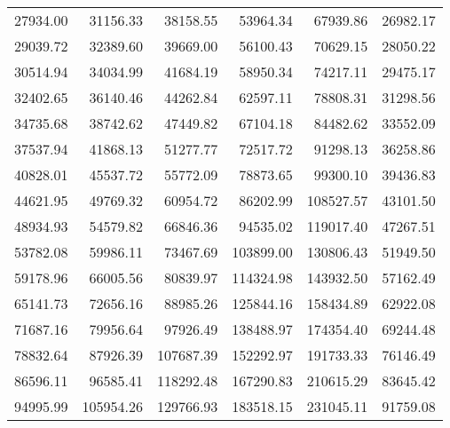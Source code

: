 \begin{tabular}{rrrrrr}
           27934.00 &            31156.33 &            38158.55 &            53964.34 &            67939.86 &            26982.17 \\
           29039.72 &            32389.60 &            39669.00 &            56100.43 &            70629.15 &            28050.22 \\
           30514.94 &            34034.99 &            41684.19 &            58950.34 &            74217.11 &            29475.17 \\
           32402.65 &            36140.46 &            44262.84 &            62597.11 &            78808.31 &            31298.56 \\
           34735.68 &            38742.62 &            47449.82 &            67104.18 &            84482.62 &            33552.09 \\
           37537.94 &            41868.13 &            51277.77 &            72517.72 &            91298.13 &            36258.86 \\
           40828.01 &            45537.72 &            55772.09 &            78873.65 &            99300.10 &            39436.83 \\
           44621.95 &            49769.32 &            60954.72 &            86202.99 &           108527.57 &            43101.50 \\
           48934.93 &            54579.82 &            66846.36 &            94535.02 &           119017.40 &            47267.51 \\
           53782.08 &            59986.11 &            73467.69 &           103899.00 &           130806.43 &            51949.50 \\
           59178.96 &            66005.56 &            80839.97 &           114324.98 &           143932.50 &            57162.49 \\
           65141.73 &            72656.16 &            88985.26 &           125844.16 &           158434.89 &            62922.08 \\
           71687.16 &            79956.64 &            97926.49 &           138488.97 &           174354.40 &            69244.48 \\
           78832.64 &            87926.39 &           107687.39 &           152292.97 &           191733.33 &            76146.49 \\
           86596.11 &            96585.41 &           118292.48 &           167290.83 &           210615.29 &            83645.42 \\
           94995.99 &           105954.26 &           129766.93 &           183518.15 &           231045.11 &            91759.08 \\

\end{tabular}
